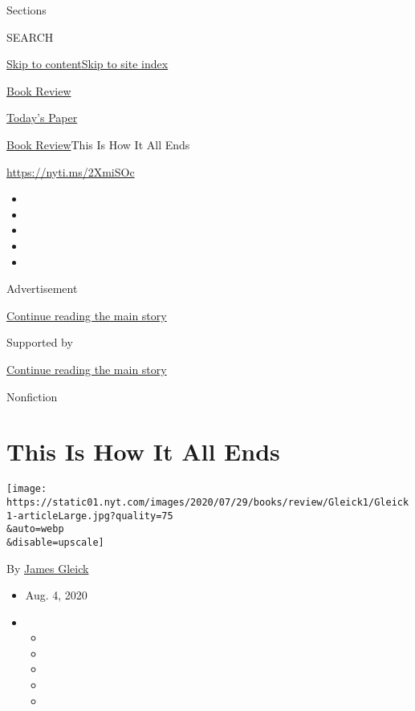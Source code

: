 Sections

SEARCH

\protect\hyperlink{site-content}{Skip to
content}\protect\hyperlink{site-index}{Skip to site index}

\href{https://www.nytimes.com/section/books/review}{Book Review}

\href{https://myaccount.nytimes.com/auth/login?response_type=cookie\&client_id=vi}{}

\href{https://www.nytimes.com/section/todayspaper}{Today's Paper}

\href{/section/books/review}{Book Review}\textbar{}This Is How It All
Ends

\href{https://nyti.ms/2XmiSOc}{https://nyti.ms/2XmiSOc}

\begin{itemize}
\item
\item
\item
\item
\item
\end{itemize}

Advertisement

\protect\hyperlink{after-top}{Continue reading the main story}

Supported by

\protect\hyperlink{after-sponsor}{Continue reading the main story}

Nonfiction

\hypertarget{this-is-how-it-all-ends}{%
\section{This Is How It All Ends}\label{this-is-how-it-all-ends}}

\texttt{[image: https://static01.nyt.com/images/2020/07/29/books/review/Gleick1/Gleick1-articleLarge.jpg?quality=75\\\&auto=webp\\\&disable=upscale]}

By \href{https://www.nytimes.com/by/james-gleick}{James Gleick}

\begin{itemize}
\item
  Aug. 4, 2020
\item
  \begin{itemize}
  \item
  \item
  \item
  \item
  \item
  \end{itemize}
\end{itemize}

